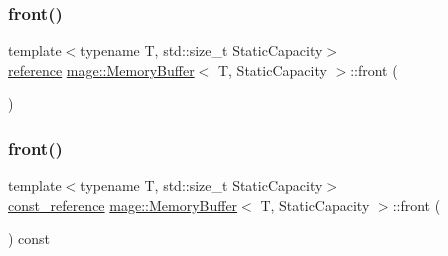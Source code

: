\mbox{\label{classmage_1_1_memory_buffer_a19e923d528e753b5834092b4d8961754}} 
\subsubsection{\texorpdfstring{front()}{front()}\hspace{0.1cm}{\footnotesize\ttfamily [1/2]}}
{\footnotesize\ttfamily template$<$typename T, std\+::size\+\_\+t Static\+Capacity$>$ \\
\mbox{\hyperlink{classmage_1_1_memory_buffer_ad28560f5391baac5dade220c99d9d62b}{reference}} \mbox{\hyperlink{classmage_1_1_memory_buffer}{mage\+::\+Memory\+Buffer}}$<$ T, Static\+Capacity $>$\+::front (\begin{DoxyParamCaption}{ }\end{DoxyParamCaption})\hspace{0.3cm}{\ttfamily [noexcept]}}

\mbox{\label{classmage_1_1_memory_buffer_ac09b5ff4c9bf387fa1f28c0a66aaaa0a}} 
\subsubsection{\texorpdfstring{front()}{front()}\hspace{0.1cm}{\footnotesize\ttfamily [2/2]}}
{\footnotesize\ttfamily template$<$typename T, std\+::size\+\_\+t Static\+Capacity$>$ \\
\mbox{\hyperlink{classmage_1_1_memory_buffer_aa54883bc0cb483fef570663344f85bb7}{const\+\_\+reference}} \mbox{\hyperlink{classmage_1_1_memory_buffer}{mage\+::\+Memory\+Buffer}}$<$ T, Static\+Capacity $>$\+::front (\begin{DoxyParamCaption}{ }\end{DoxyParamCaption}) const\hspace{0.3cm}{\ttfamily [noexcept]}}

\mbox{\label{classmage_1_1_memory_buffer_ac8b957211918ecf71cd55ac163483db2}} 

